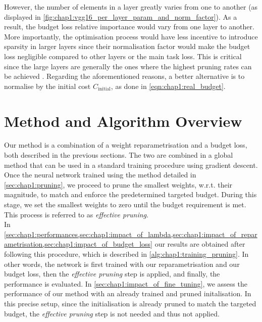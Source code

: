 However, the number of elements in a layer greatly varies from one to another
(as displayed in \cref{fig:chap1:vgg16_per_layer_param_and_norm_factor}). As a
result,  the budget loss relative importance would vary from one layer to
another. More importantly, the optimisation process would have less incentive to
introduce sparsity in larger layers since their normalisation factor would make
the budget loss negligible compared to other layers or the main task loss. This
is critical since the large layers are generally the ones where the highest
pruning rates can be achieved \cite{DBLP:journals/corr/abs-2202-12002}.
Regarding the aforementioned reasons, a better alternative is to normalise by
the initial cost $C_\text{initial}$, as done in \cref{eqn:chap1:real_budget}.\\


\section{Method and Algorithm Overview}
\label{sec:chap1:overview}
Our method is a combination of a weight reparametrisation and a budget loss,
both described in the previous sections. The two are combined in a global method
that can be used in a standard training procedure using gradient descent. Once
the neural network trained using the method detailed in
\cref{sec:chap1:pruning}, we proceed to prune the smallest weights, w.r.t. their
magnitude, to match and enforce the predetermined targeted budget. During this
stage, we set the smallest weights to zero until the budget requirement is met.
This process is referred to as \textit{effective pruning}.\\

In
\cref{sec:chap1:performances,sec:chap1:impact_of_lambda,sec:chap1:impact_of_reparametrisation,sec:chap1:impact_of_budget_loss}
our results are obtained after following this procedure, which is described in
\cref{alg:chap1:training_pruning}. In other words, the network is first trained
with our reparametrisation and our budget loss, then the \textit{effective
  pruning} step is applied, and finally, the performance is evaluated. In
\cref{sec:chap1:impact_of_fine_tuning}, we assess the performance of our method
with an already trained and pruned initalisation. In this precise setup, since
the initialisation is already pruned to match the targeted budget, the
\emph{effective pruning} step is not needed and thus not applied.\\

